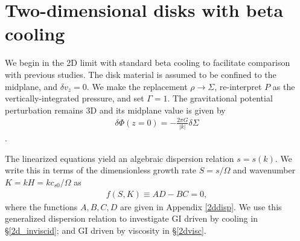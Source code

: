 \section{Two-dimensional disks with beta cooling}\label{result_2d}
We begin in the 2D limit with standard beta cooling  to facilitate comparison 
with previous studies. The disk
material is assumed to be confined to the midplane, and $\delta v_z=0$. 
We make the replacement  
$\rho \to \Sigma$, re-interpret $P$ as the vertically-integrated
pressure, and set $\Gamma=1$. %
The gravitational potential perturbation remains 3D and its midplane
value is given by    
\begin{align}
  \delta \Phi(z=0) = -\frac{2 \pi G}{|k|}\delta\Sigma
\end{align}
\citep{shu70}.
 
The linearized equations yield an algebraic dispersion relation $s =
s(k)$. We write this  
in terms of the dimensionless growth rate $S = s/\Omega$ and
wavenumber $K=kH = k c_{s0}/\Omega$ as
\begin{align}\label{thindisk}
  f(S,K)\equiv AD - BC = 0,   
\end{align}
where the functions $A,B,C,D$ are given in Appendix \ref{2ddisp}. %
We use this generalized dispersion relation  to investigate GI driven 
by cooling in \S\ref{2d_inviscid}; and GI driven by viscosity 
in \S\ref{2dvisc}. 




